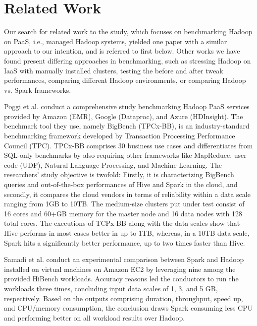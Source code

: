 \documentclass[review]{elsarticle}
\begin{document}
	\section{Related Work}
	Our search for related work to the study, which focuses on benchmarking Hadoop on PaaS, i.e., managed Hadoop systems, yielded one paper with a similar approach to our intention, and is referred to first below. Other works we have found present differing approaches in benchmarking, such as stressing Hadoop on IaaS with manually installed clusters, testing the before and after tweak performances, comparing different Hadoop environments, or comparing Hadoop vs. Spark frameworks.
	
	Poggi et al. \cite{poggi_characterizing_2018} conduct a comprehensive study benchmarking Hadoop PaaS services provided by Amazon (EMR), Google (Dataproc), and Azure (HDInsight). The benchmark tool they use, namely BigBench (TPCx-BB), is an industry-standard benchmarking framework developed by Transaction Processing Performance Council (TPC). TPCx-BB comprises 30 business use cases and differentiates from SQL-only benchmarks by also requiring other frameworks like MapReduce, user code (UDF), Natural Language Processing, and Machine Learning. The researchers' study objective is twofold: Firstly, it is characterizing BigBench queries and out-of-the-box performances of Hive and Spark in the cloud, and secondly, it compares the cloud vendors in terms of reliability within a data scale ranging from 1GB to 10TB. The medium-size clusters put under test consist of 16 cores and 60+GB memory for the master node and 16 data nodes with 128 total cores. The executions of TCPx-BB along with the data scales show that Hive performs in most cases better in up to 1TB, whereas, in a 10TB data scale, Spark hits a significantly better performance, up to two times faster than Hive.
	
	Samadi et al. \cite{samadi_performance_2018} conduct an experimental comparison between Spark and Hadoop installed on virtual machines on Amazon EC2 by leveraging nine among the provided HiBench workloads. Accuracy reasons led the conductors to run the workloads three times, concluding input data scales of 1, 3, and 5 GB, respectively. Based on the outputs comprising duration, throughput, speed up, and CPU/memory consumption, the conclusion draws Spark consuming less CPU and performing better on all workload results over Hadoop. 
	
\end{document}
